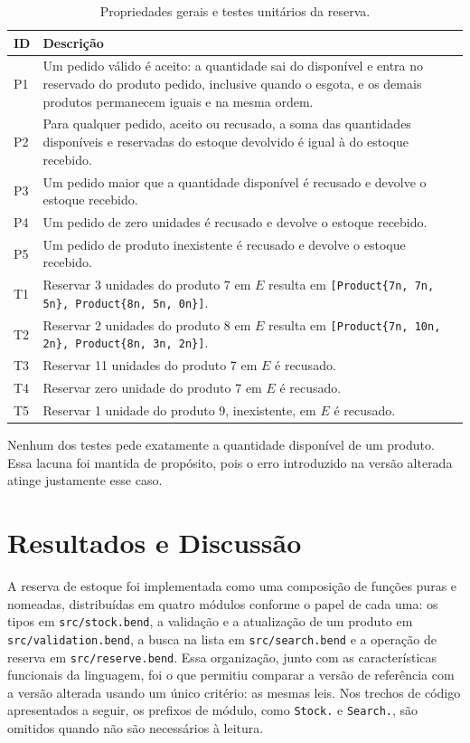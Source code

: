 \begin{table}[!ht]
\caption{Propriedades gerais e testes unitários da reserva.}
\label{tab:propriedades}
\small
\begin{tabular}{@{}lp{}@{}}
\toprule
ID & Descrição \\
\midrule
P1 & Um pedido válido é aceito: a quantidade sai do disponível e entra no reservado do produto pedido, inclusive quando o esgota, e os demais produtos permanecem iguais e na mesma ordem. \\
P2 & Para qualquer pedido, aceito ou recusado, a soma das quantidades disponíveis e reservadas do estoque devolvido é igual à do estoque recebido. \\
P3 & Um pedido maior que a quantidade disponível é recusado e devolve o estoque recebido. \\
P4 & Um pedido de zero unidades é recusado e devolve o estoque recebido. \\
P5 & Um pedido de produto inexistente é recusado e devolve o estoque recebido. \\
\midrule
T1 & Reservar 3 unidades do produto 7 em $E$ resulta em \texttt{[Product\{7n, 7n, 5n\}, Product\{8n, 5n, 0n\}]}. \\
T2 & Reservar 2 unidades do produto 8 em $E$ resulta em \texttt{[Product\{7n, 10n, 2n\}, Product\{8n, 3n, 2n\}]}. \\
T3 & Reservar 11 unidades do produto 7 em $E$ é recusado. \\
T4 & Reservar zero unidade do produto 7 em $E$ é recusado. \\
T5 & Reservar 1 unidade do produto 9, inexistente, em $E$ é recusado. \\
\bottomrule
\end{tabular}
\end{table}

Nenhum dos testes pede exatamente a quantidade disponível de um produto. Essa lacuna foi mantida de propósito, pois o erro introduzido na versão alterada atinge justamente esse caso.

\section{Resultados e Discussão}
\label{sect:resultados}

A reserva de estoque foi implementada como uma composição de funções puras e nomeadas, distribuídas em quatro módulos conforme o papel de cada uma: os tipos em \texttt{src/stock.bend}, a validação e a atualização de um produto em \texttt{src/validation.bend}, a busca na lista em \texttt{src/search.bend} e a operação de reserva em \texttt{src/reserve.bend}. Essa organização, junto com as características funcionais da linguagem, foi o que permitiu comparar a versão de referência com a versão alterada usando um único critério: as mesmas leis. Nos trechos de código apresentados a seguir, os prefixos de módulo, como \texttt{Stock.} e \texttt{Search.}, são omitidos quando não são necessários à leitura.


